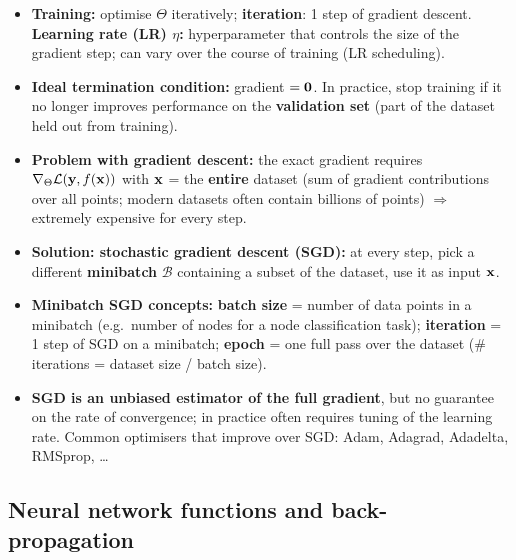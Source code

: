 \begin{itemize}
  \item \textbf{Training:} optimise $\Theta$ iteratively; \textbf{iteration}: 1
    step of gradient descent. \textbf{Learning rate (LR) $\eta$:}
    hyperparameter that controls the size of the gradient step; can vary over
    the course of training (LR scheduling).
  \item \textbf{Ideal termination condition:} gradient $=\mathbf{0}$. In practice,
    stop training if it no longer improves performance on the
    \textbf{validation set} (part of the dataset held out from training).
  \item \textbf{Problem with gradient descent:} the exact gradient requires
    $\nabla_\Theta\mathcal{L}(\mathbf{y},f(\mathbf{x}))$ with $\mathbf{x}$ = the \textbf{entire} dataset
    (sum of gradient contributions over all points; modern datasets often
    contain billions of points) $\Rightarrow$ extremely expensive for every
    step.
  \item \textbf{Solution: stochastic gradient descent (SGD):} at every step,
    pick a different \textbf{minibatch} $\mathcal{B}$ containing a subset of
    the dataset, use it as input $\mathbf{x}$.
  \item \textbf{Minibatch SGD concepts:} \textbf{batch size} = number of data
    points in a minibatch (e.g.\ number of nodes for a node classification
    task); \textbf{iteration} = 1 step of SGD on a minibatch; \textbf{epoch} =
    one full pass over the dataset (\# iterations = dataset size / batch size).
  \item \textbf{SGD is an unbiased estimator of the full gradient}, but no
    guarantee on the rate of convergence; in practice often requires tuning of
    the learning rate. Common optimisers that improve over SGD: Adam, Adagrad,
    Adadelta, RMSprop, \dots
\end{itemize}

\subsection{Neural network functions and back-propagation}\label{sec:lec03-backprop}

